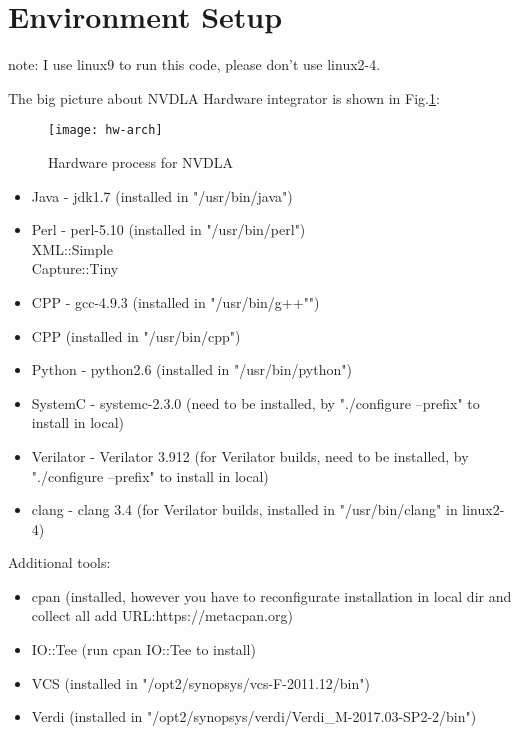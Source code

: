 \section{Environment Setup}

note: I use linux9 to run this code, please don't use linux2-4. 

The big picture about NVDLA Hardware integrator is shown in Fig.\ref{fig:hw}: 

\begin{figure}[htb]
\center
    \texttt{[image: hw-arch]}
    \label{fig:hw}
    \caption{Hardware process for NVDLA}
\end{figure}

\begin{itemize}
    \item Java - jdk1.7 (installed in "/usr/bin/java")
    \item Perl - perl-5.10 (installed in "/usr/bin/perl")\\
	XML::Simple\\
	Capture::Tiny 
    \item CPP - gcc-4.9.3 (installed in "/usr/bin/g++"")
    \item CPP (installed in "/usr/bin/cpp")
    \item Python - python2.6 (installed in "/usr/bin/python")
    \item SystemC - systemc-2.3.0 (need to be installed, by "./configure --prefix" to install in local)
    \item Verilator - Verilator 3.912 (for Verilator builds, need to be installed, by "./configure --prefix" to install in local)
    \item clang - clang 3.4 (for Verilator builds, installed in "/usr/bin/clang" in linux2-4)
\end{itemize}

Additional tools:
\begin{itemize}
    \item cpan (installed, however you have to reconfigurate installation in local dir and collect all add URL:https://metacpan.org)
    \item IO::Tee (run cpan IO::Tee to install)
    \item VCS (installed in "/opt2/synopsys/vcs-F-2011.12/bin")
    \item Verdi (installed in "/opt2/synopsys/verdi/Verdi\_M-2017.03-SP2-2/bin")
\end{itemize}

